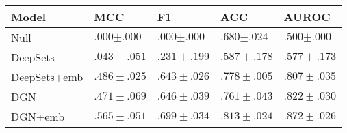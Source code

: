\begin{tabular}{lllll}
\toprule
Model & \textbf{MCC} & \textbf{F1} & \textbf{ACC} & \textbf{AUROC} \\
\midrule
Null & $.000{\scriptstyle \pm .000}$ & $.000{\scriptstyle \pm .000}$ & $.680{\scriptstyle \pm .024}$ & $.500{\scriptstyle \pm .000}$ \\
DeepSets & $.043\scriptstyle \pm .051$ & $.231\scriptstyle \pm .199$ & $.587\scriptstyle \pm .178$ & $.577\scriptstyle \pm .173$ \\
DeepSets+emb & $.486\scriptstyle \pm .025$ & $.643\scriptstyle \pm .026$ & $.778\scriptstyle \pm .005$ & $.807\scriptstyle \pm .035$ \\
DGN & $.471\scriptstyle \pm .069$ & $.646\scriptstyle \pm .039$ & $.761\scriptstyle \pm .043$ & $.822\scriptstyle \pm .030$ \\
DGN+emb & $\mathbf{.565\scriptstyle \pm .051}$ & $\mathbf{.699\scriptstyle \pm .034}$ & $\mathbf{.813\scriptstyle \pm .024}$ & $\mathbf{.872\scriptstyle \pm .026}$ \\
\bottomrule
\end{tabular}

